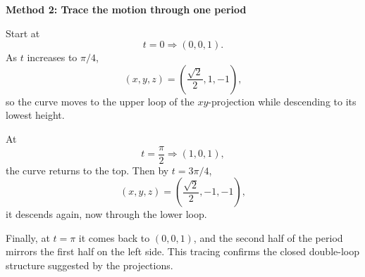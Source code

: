 \documentclass[a4paper,12pt,twocolumn]{article}
\newenvironment{solutionbox}{\begin{framed}}{\end{framed}}
\begin{document}
\begin{solutionbox}
\textbf{Method 2: Trace the motion through one period}

\begin{steps}
\item Start at
\[
t=0\Rightarrow (0,0,1).
\]
As \(t\) increases to \(\pi/4\),
\[
\left(x,y,z\right)=\left(\frac{\sqrt2}{2},1,-1\right),
\]
so the curve moves to the upper loop of the \(xy\)-projection while descending to its lowest height.

\item At
\[
t=\frac{\pi}{2}\Rightarrow (1,0,1),
\]
the curve returns to the top. Then by \(t=3\pi/4\),
\[
\left(x,y,z\right)=\left(\frac{\sqrt2}{2},-1,-1\right),
\]
it descends again, now through the lower loop.

\item Finally, at \(t=\pi\) it comes back to \((0,0,1)\), and the second half of the period mirrors the first half on the left side. This tracing confirms the closed double-loop structure suggested by the projections.
\end{steps}
\end{solutionbox}
\end{document}
